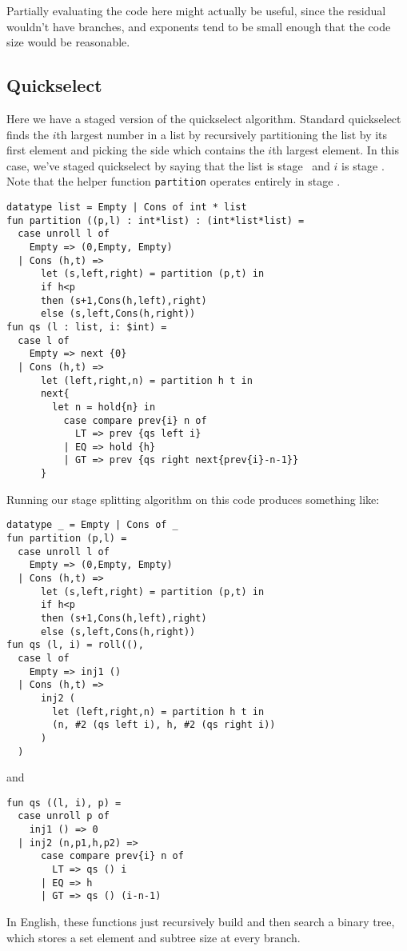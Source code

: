 Partially evaluating the code here might actually be useful, since the residual wouldn't have branches,
and exponents tend to be small enough that the code size would be reasonable.

\subsection{Quickselect}

Here we have a staged version of the quickselect algorithm.
Standard quickselect finds the $i$th largest number in a list by recursively partitioning the list by its 
first element and picking the side which contains the $i$th largest element.
In this case, we've staged quickselect by saying that the list is stage \bbone\ and $i$ is stage \bbtwo.
Note that the helper function {\tt partition} operates entirely in stage \bbone.

\begin{lstlisting} 
datatype list = Empty | Cons of int * list
fun partition ((p,l) : int*list) : (int*list*list) =
  case unroll l of 
    Empty => (0,Empty, Empty) 
  | Cons (h,t) =>
      let (s,left,right) = partition (p,t) in
      if h<p 
      then (s+1,Cons(h,left),right)
      else (s,left,Cons(h,right))
fun qs (l : list, i: $int) = 
  case l of
    Empty => next {0}
  | Cons (h,t) => 
      let (left,right,n) = partition h t in
      next{
        let n = hold{n} in
          case compare prev{i} n of
            LT => prev {qs left i}
          | EQ => hold {h}
          | GT => prev {qs right next{prev{i}-n-1}}
      }	
\end{lstlisting}
Running our stage splitting algorithm on this code produces something like:
\begin{lstlisting} 
datatype _ = Empty | Cons of _
fun partition (p,l) =
  case unroll l of 
    Empty => (0,Empty, Empty) 
  | Cons (h,t) =>
      let (s,left,right) = partition (p,t) in
      if h<p 
      then (s+1,Cons(h,left),right)
      else (s,left,Cons(h,right))
fun qs (l, i) = roll((), 
  case l of
    Empty => inj1 ()
  | Cons (h,t) => 
      inj2 (
        let (left,right,n) = partition h t in
        (n, #2 (qs left i), h, #2 (qs right i))
      )
  )
\end{lstlisting}
and 
\begin{lstlisting} 
fun qs ((l, i), p) = 
  case unroll p of
    inj1 () => 0
  | inj2 (n,p1,h,p2) => 
      case compare prev{i} n of
        LT => qs () i
      | EQ => h
      | GT => qs () (i-n-1)
\end{lstlisting}
In English, these functions just recursively build and then search a binary tree,
which stores a set element and subtree size at every branch.

